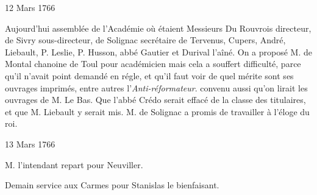                      \begin{diary}{12 Mars 1766}{}

                         Aujourd'hui assemblée de l'Académie
                           où étaient Messieurs
                           Du Rouvrois directeur,
                           de Sivry
                           sous-directeur, de Solignac
                           secrétaire
                           de Tervenus, Cupers, André, Liebault,
                           P. Leslie, P. Husson, abbé
                              Gautier et
                           Durival l'aîné. On a proposé
                              M. de
                              Montal chanoine de Toul pour académicien
                           mais cela a souffert difficulté, parce qu'il
                           n'avait point demandé en régle, et qu'il
                           faut voir de quel mérite sont ses ouvrages
                           imprimés, entre autres l'\emph{Anti-réformateur}.
                           convenu aussi qu'on lirait les ouvrages de
                           M. Le Bas. Que l'abbé Crédo serait effacé de la classe des titulaires, et que M. Liebault
                           y serait mis. M. de Solignac
                           a promis
                           de travailler à l'éloge du roi.
                        \bigskip


                     \end{diary}
                     \begin{diary}{13 Mars 1766}{}


                           M. l'intendant repart pour
                              Neuviller. \bigskip


                         Demain service aux Carmes pour
                           Stanislas le bienfaisant. \bigskip


                     \end{diary}

